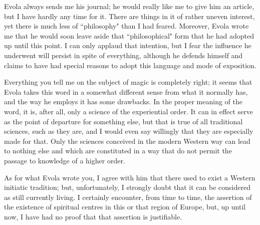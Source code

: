 Evola always sends me his journal; he would really like me to give him an article, but I have hardly any time for it. There are things in it of rather uneven interest, yet there is much less of ``philosophy" than I had feared. Moreover, Evola wrote me that he would soon leave aside that ``philosophical" form that he had adopted up until this point. I can only applaud that intention, but I fear the influence he underwent will persist in spite of everything, although he defends himself and claims to have had special reasons to adopt this language and mode of exposition.

Everything you tell me on the subject of magic is completely right; it seems that Evola takes this word in a somewhat different sense from what it normally has, and the way he employs it has some drawbacks. In the proper meaning of the word, it is, after all, only a science of the experiential order. It can in effect serve as the point of departure for something else, but that is true of all traditional sciences, such as they are, and I would even say willingly that they are especially made for that. Only the sciences conceived in the modern Western way can lead to nothing else and which are constituted in a way that do not permit the passage to knowledge of a higher order.

As for what Evola wrote you, I agree with him that there used to exist a Western initiatic tradition; but, unfortunately, I strongly doubt that it can be considered as still currently living. I certainly encounter, from time to time, the assertion of the existence of spiritual centres in this or that region of Europe, but, up until now, I have had no proof that that assertion is justifiable.



